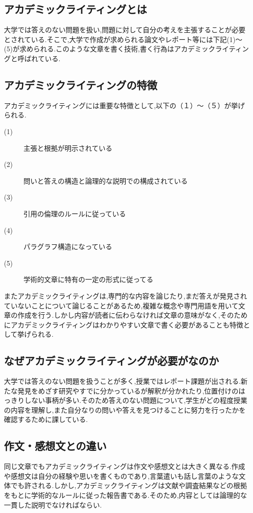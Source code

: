 \documentclass[a4j,12pt]{jarticle}
\begin{document}
\subsection{アカデミックライティングとは}
大学では答えのない問題を扱い,問題に対して自分の考えを主張することが必要とされている.そこで,大学で作成が求められる論文やレポート等には下記(1)〜(5)が求められる.このような文章を書く技術,書く行為はアカデミックライティングと呼ばれている\cite{ren2}.
\subsection{アカデミックライティングの特徴}
アカデミックライティングには重要な特徴として,以下の（１）〜（５）が挙げられる.
\begin{description}
  \item[(1)] 主張と根拠が明示されている
  \item[(2)] 問いと答えの構造と論理的な説明での構成されている
  \item[(3)] 引用の倫理のルールに従っている
  \item[(4)] パラグラフ構造になっている
  \item[(5)] 学術的文章に特有の一定の形式に従ってる
 \end{description}
 またアカデミックライティングは,専門的な内容を論じたり,まだ答えが発見されていないことについて論じることがあるため,複雑な概念や専門用語を用いて文章の作成を行う.しかし内容が読者に伝わらなければ文章の意味がなく,そのためにアカデミックライティングはわかりやすい文章で書く必要があることも特徴として挙げられる\cite{ren7}.
 
\subsection{なぜアカデミックライティングが必要がなのか}
大学では答えのない問題を扱うことが多く,授業ではレポート課題が出される.新たな発見をめざす研究やすでに分かっているが解釈が分かれたり,位置付けのはっきりしない事柄が多い.そのため答えのない問題について,学生がどの程度授業の内容を理解し,また自分なりの問いや答えを見つけることに努力を行ったかを確認するために課している.

\subsection{作文・感想文との違い}
同じ文章でもアカデミックライティングは作文や感想文とは大きく異なる.作成や感想文は自分の経験や思いを書くものであり,言葉遣いも話し言葉のような文体でも許される.しかし,アカデミックライティングは文献や調査結果などの根拠をもとに学術的なルールに従った報告書である.そのため,内容としては論理的な一貫した説明でなければならい.
\end{document}
